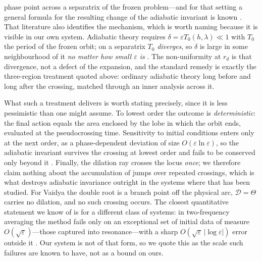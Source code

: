 \documentclass[12pt]{iopart}
\theoremstyle{plain}
\theoremstyle{definition}
\theoremstyle{remark}
\begin{document}
phase point across a separatrix of the frozen problem---and for that setting a
general formula for the resulting change of the adiabatic invariant is known
\cite{Timofeev1978,CaryEscandeTennyson1986,Neishtadt1986}. That literature also
identifies the mechanism, which is worth naming because it is visible in our own
system. Adiabatic theory requires $\delta=\varepsilon T_0(h,\lambda)\ll1$ with $T_0$
the period of the frozen orbit; on a separatrix $T_0$ \emph{diverges}, so $\delta$ is
large in some neighbourhood of it \emph{no matter how small $\varepsilon$ is}
\cite[\S I]{CaryEscandeTennyson1986}. The non-uniformity at $r_d$ is that
divergence, not a defect of the expansion, and the standard remedy is exactly the
three-region treatment quoted above: ordinary adiabatic theory long before and long
after the crossing, matched through an inner analysis across it.

What such a treatment delivers is worth stating precisely, since it is less
pessimistic than one might assume. To lowest order the outcome is
\emph{deterministic}: the final action equals the area enclosed by the lobe in which
the orbit ends, evaluated at the pseudocrossing time. Sensitivity to initial
conditions enters only at the next order, as a phase-dependent deviation of size
$O(\varepsilon\ln\varepsilon)$, so the adiabatic invariant survives the crossing at
lowest order and fails to be conserved only beyond it
\cite{CaryEscandeTennyson1986}. Finally, the dilation ray crosses the locus
\emph{once}; we therefore claim nothing about the accumulation of jumps over
repeated crossings, which is what destroys adiabatic invariance outright in the
systems where that has been studied. For Vaidya the double
root is a branch point off the physical arc, $\mathcal D=\Theta$ carries no dilation,
and no such crossing occurs.
The closest quantitative statement we know of is for a different class of
systems: in two-frequency averaging the method fails only on an exceptional set
of initial data of measure $O(\sqrt\varepsilon)$---those captured into
resonance---with a sharp $O(\sqrt\varepsilon\,|\!\log\varepsilon|)$ error outside
it \cite{Neishtadt2013}. Our system is not of that form, so we quote this as the
scale such failures are known to have, not as a bound on ours.



\clearpage
\end{document}
